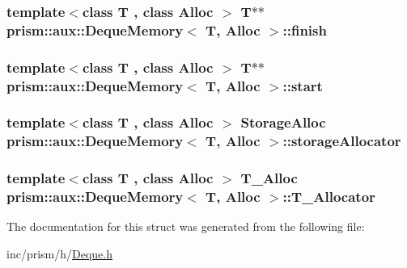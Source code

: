 \subsubsection[{\texorpdfstring{finish}{finish}}]{\setlength{\rightskip}{0pt plus 5cm}template$<$class T , class Alloc $>$ T$\ast$$\ast$ {\bf prism\+::aux\+::\+Deque\+Memory}$<$ T, Alloc $>$\+::finish}\hypertarget{structprism_1_1aux_1_1_deque_memory_abc882c56fe6797c766bea89924801020}{}\label{structprism_1_1aux_1_1_deque_memory_abc882c56fe6797c766bea89924801020}
\subsubsection[{\texorpdfstring{start}{start}}]{\setlength{\rightskip}{0pt plus 5cm}template$<$class T , class Alloc $>$ T$\ast$$\ast$ {\bf prism\+::aux\+::\+Deque\+Memory}$<$ T, Alloc $>$\+::start}\hypertarget{structprism_1_1aux_1_1_deque_memory_aa7e9880e7681523029c4d7664d7743f2}{}\label{structprism_1_1aux_1_1_deque_memory_aa7e9880e7681523029c4d7664d7743f2}
\subsubsection[{\texorpdfstring{storage\+Allocator}{storageAllocator}}]{\setlength{\rightskip}{0pt plus 5cm}template$<$class T , class Alloc $>$ {\bf Storage\+Alloc} {\bf prism\+::aux\+::\+Deque\+Memory}$<$ T, Alloc $>$\+::storage\+Allocator}\hypertarget{structprism_1_1aux_1_1_deque_memory_a4aa5eb83afed81aab8a6031c02114252}{}\label{structprism_1_1aux_1_1_deque_memory_a4aa5eb83afed81aab8a6031c02114252}
\subsubsection[{\texorpdfstring{T\+\_\+\+Allocator}{T_Allocator}}]{\setlength{\rightskip}{0pt plus 5cm}template$<$class T , class Alloc $>$ {\bf T\+\_\+\+Alloc} {\bf prism\+::aux\+::\+Deque\+Memory}$<$ T, Alloc $>$\+::T\+\_\+\+Allocator}\hypertarget{structprism_1_1aux_1_1_deque_memory_ac2785bd032610f17d9e7e5aee422ff60}{}\label{structprism_1_1aux_1_1_deque_memory_ac2785bd032610f17d9e7e5aee422ff60}


The documentation for this struct was generated from the following file\+:\begin{DoxyCompactItemize}
\item 
inc/prism/h/\hyperlink{_deque_8h}{Deque.\+h}\end{DoxyCompactItemize}
